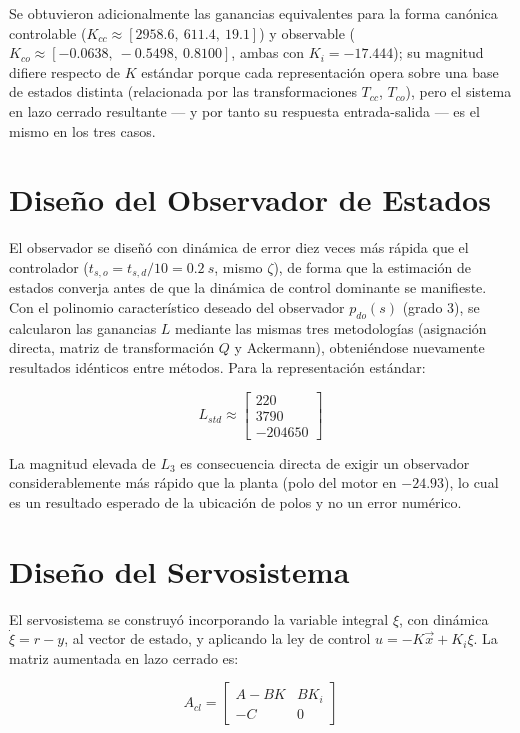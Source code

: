 \documentclass[conference]{IEEEtran}
\begin{document}
Se obtuvieron adicionalmente las ganancias equivalentes para la forma canónica controlable ($K_{cc}\approx[2958.6,\ 611.4,\ 19.1]$) y observable ($K_{co}\approx[-0.0638,\ -0.5498,\ 0.8100]$, ambas con $K_i=-17.444$); su magnitud difiere respecto de $K$ estándar porque cada representación opera sobre una base de estados distinta (relacionada por las transformaciones $T_{cc}$, $T_{co}$), pero el sistema en lazo cerrado resultante --- y por tanto su respuesta entrada-salida --- es el mismo en los tres casos.

\section{Diseño del Observador de Estados}
\label{sec:observador}

El observador se diseñó con dinámica de error diez veces más rápida que el controlador ($t_{s,o}=t_{s,d}/10=\SI{0.2}{s}$, mismo $\zeta$), de forma que la estimación de estados converja antes de que la dinámica de control dominante se manifieste. Con el polinomio característico deseado del observador $p_{do}(s)$ (grado 3), se calcularon las ganancias $L$ mediante las mismas tres metodologías (asignación directa, matriz de transformación $Q$ y Ackermann), obteniéndose nuevamente resultados idénticos entre métodos. Para la representación estándar:

\begin{equation}
L_{std} \approx \begin{bmatrix} 220 \\ 3790 \\ -204650 \end{bmatrix}
\end{equation}

La magnitud elevada de $L_3$ es consecuencia directa de exigir un observador considerablemente más rápido que la planta (polo del motor en $-24.93$), lo cual es un resultado esperado de la ubicación de polos y no un error numérico.

\section{Diseño del Servosistema}
\label{sec:servo}

El servosistema se construyó incorporando la variable integral $\xi$, con dinámica $\dot\xi = r - y$, al vector de estado, y aplicando la ley de control $u = -K\vec{x} + K_i\xi$. La matriz aumentada en lazo cerrado es:

\begin{equation}
A_{cl} = \begin{bmatrix} A - BK & BK_i \\ -C & 0 \end{bmatrix}
\end{equation}
\end{document}
